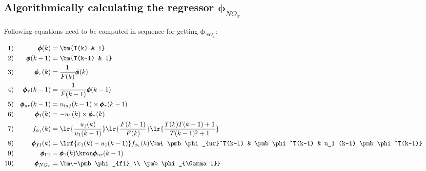 \subsection{Algorithmically calculating the regressor $\pmb \phi_{NO_x}$}

Following equations need to be computed in sequence for getting $\pmb \phi_{NO_x}$:


\begin{align*}
        1)&& \pmb \phi(k) &= \bm{T(k) & 1}\\
        2)&& \pmb \phi(k-1) &= \bm{T(k-1) & 1} \\
        3)&& \pmb \phi_\tau(k) &= \frac{1}{F(k)} \pmb \phi(k)\\
        4)&& \pmb \phi_\tau(k-1)&= \frac{1}{F(k-1)} \pmb \phi(k-1)\\
        5)&& \pmb \phi_{ur}(k-1)&= u_{inj}(k-1) \times \pmb \phi_\tau (k-1) \\
        6)&& \pmb \phi_1(k) &= -u_1(k) \times \pmb \phi_\tau(k)\\
        7)&& f_{\phi_1}(k) &= \lr{\frac{u_1(k)}{u_1(k-1)}}
                                \lr{\frac{F(k-1)}{F(k)}}
                                        \lr{\frac{T(k)T(k-1) + 1}{T(k-1)^2 + 1}}\\
        8)&& \pmb \phi_{f1}(k) &= \lrf{{x_1(k) - u_1(k-1)}} f_{\phi_1}(k)
                                \bm{ \pmb \phi_{ur}^T(k-1) &
                                    \pmb \phi^T(k-1)  &
                                    u_1 (k-1) \pmb \phi^T(k-1)}   \\
        9)&& \pmb \phi_{\Gamma 1} &= \pmb \phi_1 (k) \kron \pmb \phi_{ur} (k-1) \\
        10)&& \pmb \phi_{NO_x} &= \bm{-\pmb \phi_{f1} \\ \pmb \phi_{\Gamma 1}}
\end{align*}
